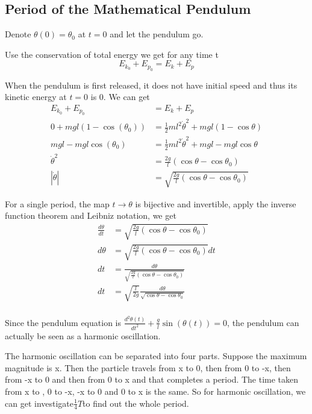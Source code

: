 \documentclass{article}
\begin{document}
\subsection{Period of the Mathematical Pendulum}
\par Denote $ \theta (0) = \theta_0$ at $t=0$ and let the pendulum go.
\par Use the conservation of total energy we get for any time t
\begin{equation*}
E_{k_0} + E_{p_0} = E_k +E_p
\end{equation*}
	\par When the pendulum is first released, it does not have initial speed and thus its kinetic energy at $t=0$ is $0$. We can get 
\begin{equation*}
 \begin{aligned}
E_{k_0} + E_{p_0} & = E_k +E_p \\
0+mgl(1-\cos(\theta_0)) & = \frac{1}{2}ml^2 \dot{\theta}^2 +mgl(1-\cos\theta)\\
mgl -mgl \cos(\theta_0) & =  \frac{1}{2}ml^2 \dot{\theta}^2  +mgl -mgl\cos\theta \\
 \dot{\theta}^2 &= \frac{2g}{l}(\cos\theta - \cos \theta_0) \\
 | \dot{\theta}| &= \sqrt{ \frac{2g}{l}(\cos\theta - \cos \theta_0) }
 \end{aligned}
\end{equation*}
	\par For a single period, the map $t \rightarrow \theta $ is bijective and invertible, apply the inverse function theorem  and Leibniz notation, we get 
\begin{equation*}
 \begin{aligned}
 \frac{d \theta}{dt} & = \sqrt{ \frac{2g}{l}(\cos\theta - \cos \theta_0) } \\
 d \theta & = \sqrt{ \frac{2g}{l}(\cos\theta - \cos \theta_0) } dt \\
 dt &= \frac{d \theta}{\sqrt{ \frac{2g}{l}(\cos\theta - \cos \theta_0) }} \\
 dt & = \sqrt{\frac{l}{2g}} \frac{d \theta} {\sqrt{\cos\theta - \cos \theta_0}} \\
 \end{aligned}
\end{equation*}
\par Since the pendulum equation is $ \frac{d^2 \theta(t)}{dt^2} + \frac{g}{l}\sin(\theta (t)) =0 $, the pendulum can actually be seen as a harmonic oscillation. 
\par The harmonic oscillation can be separated into four parts. Suppose the maximum magnitude is x. Then the particle travels from x to 0, then from 0 to -x, then from -x to 0 and then from 0 to x and that completes a period. The time taken from x to , 0 to -x, -x to 0 and 0 to x is the same. So for harmonic oscillation, we can get investigate$ \frac{1}{4}T $to find out the whole period.
\end{document}
